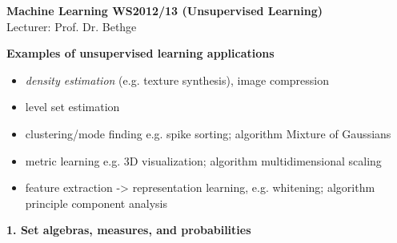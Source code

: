 \documentclass[11pt]{article}
\begin{document}
\begin{center}
{\LARGE\bf  
Machine Learning WS2012/13 (Unsupervised Learning)}\\[.5cm]
{\Large Lecturer: Prof. Dr. Bethge}\\[1cm]
\end{center}

\textbf{Examples of unsupervised learning applications}
\begin{itemize}
	\item \emph{density estimation} (e.g. texture synthesis), image compression
	\item level set estimation
	\item clustering/mode finding e.g. spike sorting; algorithm Mixture of Gaussians
	\item metric learning e.g. 3D visualization; algorithm multidimensional scaling
	\item feature extraction -> representation learning, e.g. whitening; algorithm principle component analysis
\end{itemize}

{\bf 1. Set algebras, measures, and probabilities}
\end{document}
